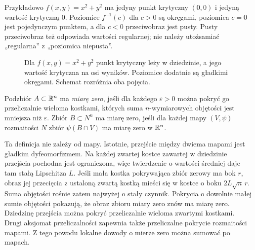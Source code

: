Przykładowo $f(x,y)=x^2+y^2$ ma jedyny punkt
krytyczny $(0,0)$ i jedyną wartość krytyczną $0$.
Poziomice $f^{-1}(c)$ dla $c>0$ są okręgami, poziomica
$c=0$ jest pojedynczym punktem, a dla $c<0$
przeciwobraz jest pusty. Pusty przeciwobraz też
odpowiada wartości regularnej; nie należy utożsamiać
„regularna” z „poziomica niepusta”.

\begin{figure}[htbp]
\centering
{}
\caption{Dla $f(x,y)=x^2+y^2$ punkt krytyczny leży w
dziedzinie, a jego wartość krytyczna na osi wyników.
Poziomice dodatnie są gładkimi okręgami. Schemat
rozróżnia oba pojęcia.}
\label{fig:sard-poziomice}
\end{figure}

\begin{definicja}
\label{def:sard-zero-miary}
Podzbiór $A\subset\mathbb{R}^n$ ma \emph{miarę zero},
jeśli dla każdego $\varepsilon>0$ można pokryć go
przeliczalnie wieloma kostkami, których suma
$n$-wymiarowych objętości jest mniejsza niż
$\varepsilon$. Zbiór $B\subset N^n$ ma miarę zero,
jeśli dla każdej mapy $(V,\psi)$ rozmaitości $N$
zbiór $\psi(B\cap V)$ ma miarę zero w $\mathbb{R}^n$.
\end{definicja}

Ta definicja nie zależy od mapy. Istotnie, przejście
między dwiema mapami jest gładkim dyfeomorfizmem.
Na każdej zwartej kostce zawartej w dziedzinie przejścia
pochodna jest ograniczona, więc twierdzenie o wartości
średniej daje tam stałą Lipschitza $L$. Jeśli mała kostka
pokrywająca zbiór zerowy ma bok $r$, obraz jej przecięcia
z ustaloną zwartą kostką mieści się w kostce o boku $2L\sqrt n\,r$.
Suma objętości rośnie zatem najwyżej o stały czynnik.
Pokrycia o dowolnie małej sumie objętości pokazują,
że obraz zbioru miary zero znów ma miarę zero. Dziedzinę przejścia można
pokryć przeliczalnie wieloma zwartymi kostkami.
Drugi aksjomat przeliczalności zapewnia także
przeliczalne pokrycie rozmaitości mapami. Z tego
powodu lokalne dowody o mierze zero można
sumować po mapach.

